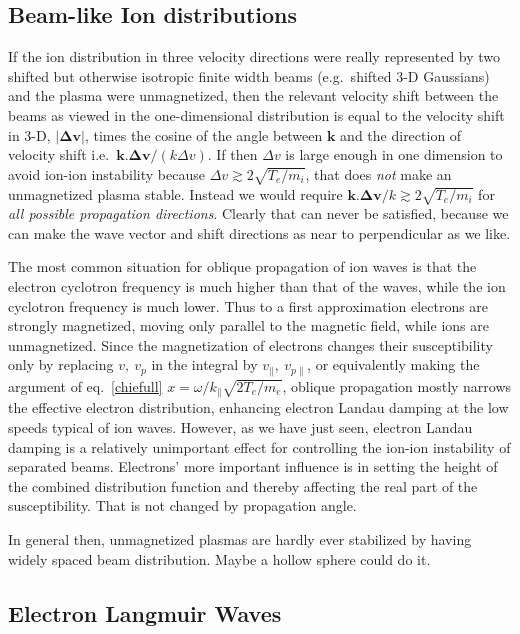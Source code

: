 \documentclass[12pt]{article}
\begin{document}
\subsection{Beam-like Ion distributions}
If the ion distribution in three velocity directions were really
represented by two shifted but otherwise isotropic finite width beams
(e.g.\ shifted 3-D Gaussians) and the plasma were unmagnetized, then
the relevant velocity shift between the beams as viewed in the
one-dimensional distribution is equal to the velocity shift in 3-D,
$|\bm{\Delta v}|$, times the cosine of the angle between $\bm k$ and
the direction of velocity shift i.e.\
$\bm k.\bm{\Delta v}/(k\Delta v)$. If then $\Delta v$ is large enough
in one dimension to avoid ion-ion instability because
$\Delta v \gtrsim 2\sqrt{T_e/m_i}$, that does \emph{not} make an unmagnetized
plasma stable. Instead we would require
$\bm{k.\Delta v}/k \gtrsim 2\sqrt{T_e/m_i}$ for \emph{all possible
  propagation directions}. Clearly that can never be satisfied,
because we can make the wave vector and shift directions as near to
perpendicular as we like. 

The most common situation for oblique propagation of ion waves is that
the electron cyclotron frequency is much higher than that of the
waves, while the ion cyclotron frequency is much lower. Thus to a
first approximation electrons are strongly magnetized, moving only
parallel to the magnetic field, while ions are unmagnetized. Since the
magnetization of electrons changes their susceptibility only by
replacing $v,\ v_p$ in the integral by $v_\parallel,\ v_{p\parallel}$,
or equivalently making the argument of eq.\ \ref{chiefull}
$x=\omega/k_\parallel \sqrt{2T_e/m_e}$, oblique propagation mostly
narrows the effective electron distribution, enhancing electron Landau
damping at the low speeds typical of ion waves. However, as we have
just seen, electron Landau damping is a relatively unimportant effect
for controlling the ion-ion instability of separated beams. Electrons'
more important influence is in setting the height of the combined
distribution function and thereby affecting the real part of the
susceptibility. That is not changed by propagation angle.

In general then, unmagnetized plasmas are hardly ever stabilized by
having widely spaced beam distribution. Maybe a hollow sphere could do it. 




\subsection{Electron Langmuir Waves}
\label{elecLang}
\end{document}
